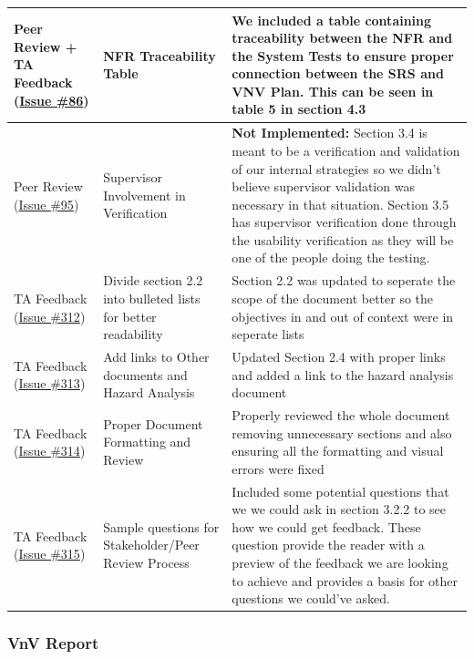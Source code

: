 \documentclass{article}
\begin{document}
\begin{longtable}{|>{\raggedright\arraybackslash}p{}|>{\raggedright\arraybackslash}p{}|>{\raggedright\arraybackslash}p{}|}
\hline
Peer Review + TA Feedback (\href{https://github.com/VirochaanRG/MES-Event-Management-System/issues/86}{Issue \#86})  & NFR Traceability Table & We included a table containing traceability between the NFR and the System Tests to ensure proper connection between the SRS and VNV Plan. This can be seen in table 5 in section 4.3\\
\hline
Peer Review (\href{https://github.com/VirochaanRG/MES-Event-Management-System/issues/95}{Issue \#95})  &Supervisor Involvement in Verification & \textbf{Not Implemented:} Section 3.4 is meant to be a verification and validation of our internal strategies so we didn't believe supervisor validation was necessary in that situation. Section 3.5 has supervisor verification done through the usability verification as they will be one of the people doing the testing. \\
\hline
TA Feedback (\href{https://github.com/VirochaanRG/MES-Event-Management-System/issues/312}{Issue \#312})  & Divide section 2.2 into bulleted lists for better readability & Section 2.2 was updated to seperate the scope of the document better so the objectives in and out of context were in seperate lists\\
\hline
TA Feedback (\href{https://github.com/VirochaanRG/MES-Event-Management-System/issues/313}{Issue \#313})  & Add links to Other documents and Hazard Analysis &Updated Section 2.4 with proper links and added a link to the hazard analysis document\\
TA Feedback (\href{https://github.com/VirochaanRG/MES-Event-Management-System/issues/314}{Issue \#314})  & Proper Document Formatting and Review & Properly reviewed the whole document removing unnecessary sections and also ensuring all the formatting and visual errors were fixed\\
TA Feedback (\href{https://github.com/VirochaanRG/MES-Event-Management-System/issues/315}{Issue \#315})  & Sample questions for Stakeholder/Peer Review Process& Included some potential questions that we we could ask in section 3.2.2 to see how we could get feedback. These question provide the reader with a preview of the feedback we are looking to achieve and provides a basis for other questions we could've asked.\\
\hline
\end{longtable}

\subsubsection{VnV Report}
\end{document}
